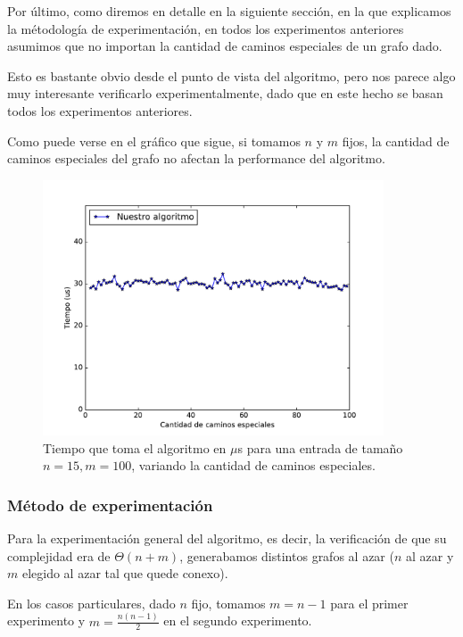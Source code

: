 Por último, como diremos en detalle en la siguiente sección, en la que explicamos la métodología de experimentación, en todos los experimentos anteriores asumimos que no importan la cantidad de caminos especiales de un grafo dado.

Esto es bastante obvio desde el punto de vista del algoritmo, pero nos parece algo muy interesante verificarlo experimentalmente, dado que en este hecho se basan todos los experimentos anteriores.

Como puede verse en el gráfico que sigue, si tomamos $n$ y $m$ fijos, la cantidad de caminos especiales del grafo no afectan la performance del algoritmo.

\begin{figure}[H]
 \centering
	\includegraphics[width=0.9\textwidth]{img/exp/problema1-especiales.pdf}
	\caption{\footnotesize Tiempo que toma el algoritmo en $\mu$s para una entrada de tamaño $n = 15, m = 100$, variando la cantidad de caminos especiales.}
	\label{fig:problema1-especiales}
\end{figure}



\subsubsection{M\'etodo de experimentación}

Para la experimentación general del algoritmo, es decir, la verificación de que su complejidad era de $\Theta(n+m)$, generabamos distintos grafos al azar ($n$ al azar y $m$ elegido al azar tal que quede conexo).

En los casos particulares, dado $n$ fijo, tomamos $m = n - 1$ para el primer experimento y $m = \frac{n (n - 1)}{2}$ en el segundo experimento.

